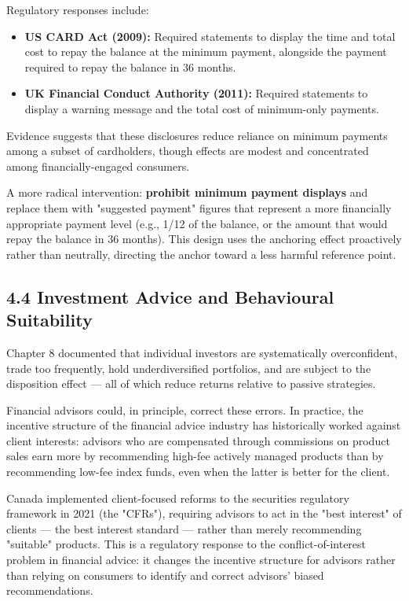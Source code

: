 \documentclass[12pt, letterpaper]{article}
\begin{document}
Regulatory responses include:
\begin{itemize}
\item \textbf{US CARD Act (2009):} Required statements to display the time and total cost to repay the balance at the minimum payment, alongside the payment required to repay the balance in 36 months.
\item \textbf{UK Financial Conduct Authority (2011):} Required statements to display a warning message and the total cost of minimum-only payments.
\end{itemize}

Evidence suggests that these disclosures reduce reliance on minimum payments among a subset of cardholders, though effects are modest and concentrated among financially-engaged consumers.

A more radical intervention: \textbf{prohibit minimum payment displays} and replace them with "suggested payment" figures that represent a more financially appropriate payment level (e.g., 1/12 of the balance, or the amount that would repay the balance in 36 months). This design uses the anchoring effect proactively rather than neutrally, directing the anchor toward a less harmful reference point.


\subsection{4.4 Investment Advice and Behavioural Suitability}


Chapter 8 documented that individual investors are systematically overconfident, trade too frequently, hold underdiversified portfolios, and are subject to the disposition effect --- all of which reduce returns relative to passive strategies.

Financial advisors could, in principle, correct these errors. In practice, the incentive structure of the financial advice industry has historically worked against client interests: advisors who are compensated through commissions on product sales earn more by recommending high-fee actively managed products than by recommending low-fee index funds, even when the latter is better for the client.

Canada implemented client-focused reforms to the securities regulatory framework in 2021 (the "CFRs"), requiring advisors to act in the "best interest" of clients --- the best interest standard --- rather than merely recommending "suitable" products. This is a regulatory response to the conflict-of-interest problem in financial advice: it changes the incentive structure for advisors rather than relying on consumers to identify and correct advisors' biased recommendations.
\end{document}
